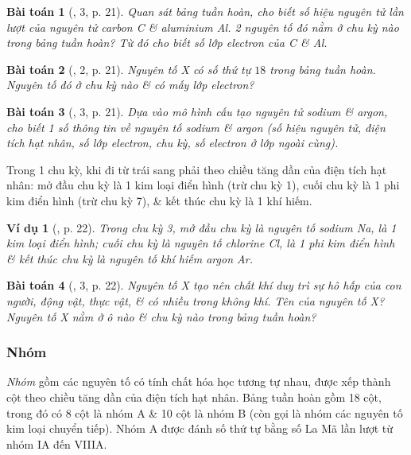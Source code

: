 \documentclass{article}
\newtheorem{baitoan}{Bài toán}
\newtheorem{vidu}{Ví dụ}
\begin{document}
\begin{baitoan}[\cite{SGK_KHTN_7_Canh_Dieu}, 3, p. 21]
	Quan sát bảng tuần hoàn, cho biết số hiệu nguyên tử lần lượt của nguyên tử carbon \emph{C} \& aluminium \emph{Al}. 2 nguyên tố đó nằm ở chu kỳ nào trong bảng tuần hoàn? Từ đó cho biết số lớp electron của \emph{C} \& \emph{Al}.
\end{baitoan}

\begin{baitoan}[\cite{SGK_KHTN_7_Canh_Dieu}, 2, p. 21]
	Nguyên tố X có số thứ tự $18$ trong bảng tuần hoàn. Nguyên tố đó ở chu kỳ nào \& có mấy lớp electron?
\end{baitoan}

\begin{baitoan}[\cite{SGK_KHTN_7_Canh_Dieu}, 3, p. 21]
	Dựa vào mô hình cấu tạo nguyên tử sodium \& argon, cho biết 1 số thông tin về nguyên tố sodium \& argon (số hiệu nguyên tử, điện tích hạt nhân, số lớp electron, chu kỳ, số electron ở lớp ngoài cùng).
\end{baitoan}
Trong 1 chu kỳ, khi đi từ trái sang phải theo chiều tăng dần của điện tích hạt nhân: mở đầu chu kỳ là 1 kim loại điển hình (trừ chu kỳ 1), cuối chu kỳ là 1 phi kim điển hình (trừ chu kỳ 7), \& kết thúc chu kỳ là 1 khí hiếm.

\begin{vidu}[\cite{SGK_KHTN_7_Canh_Dieu}, p. 22]
	 Trong chu kỳ 3, mở đầu chu kỳ là nguyên tố sodium \emph{Na}, là 1 kim loại điển hình; cuối chu kỳ là nguyên tố chlorine \emph{Cl}, là 1 phi kim điển hình \& kết thúc chu kỳ là nguyên tố khí hiếm argon \emph{Ar}.
\end{vidu}

\begin{baitoan}[\cite{SGK_KHTN_7_Canh_Dieu}, 3, p. 22]
	Nguyên tố X tạo nên chất khí duy trì sự hô hấp của con người, động vật, thực vật, \& có nhiều trong không khí. Tên của nguyên tố X? Nguyên tố X nằm ở ô nào \& chu kỳ nào trong bảng tuần hoàn?
\end{baitoan}

\subsubsection{Nhóm}
\textit{Nhóm} gồm các nguyên tố có tính chất hóa học tương tự nhau, được xếp thành cột theo chiều tăng dần của điện tích hạt nhân. Bảng tuần hoàn gồm 18 cột, trong đó có 8 cột là nhóm A \& 10 cột là nhóm B (còn gọi là nhóm các nguyên tố kim loại chuyển tiếp). Nhóm A được đánh số thứ tự bằng số La Mã lần lượt từ nhóm IA đến VIIIA.
\end{document}
